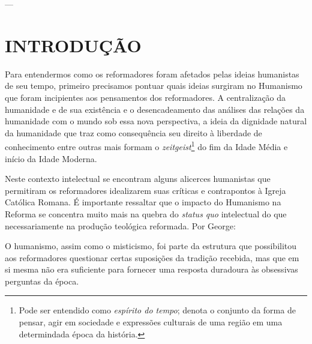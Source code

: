 \documentclass[
    article,            %
	12pt,				%
	oneside,			%
	a4paper,			%
	chapter=TITLE,		%
	section=TITLE,		%
	english,			%
	french,				%
	spanish,			%
	brazil				%
	]{abntex2}
\begin{document}



\imprimircapa

\imprimirfolhaderosto

---
\tableofcontents*
\cleardoublepage

\textual



\section{INTRODUÇÃO}
Para entendermos como os reformadores foram afetados pelas ideias humanistas de seu tempo, primeiro precisamos pontuar quais ideias surgiram no Humanismo que foram incipientes aos pensamentos dos reformadores. A centralização da humanidade e de sua existência e o desencadeamento das análises das relações da humanidade com o mundo sob essa nova perspectiva, a ideia da dignidade natural da humanidade que traz como consequência seu direito à liberdade de conhecimento entre outras mais formam o \emph{zeitgeist}\footnote{Pode ser entendido como \emph{espírito do tempo}; denota o conjunto da forma de pensar, agir em sociedade e expressões culturais de uma região em uma determindada época da história.} do fim da Idade Média e início da Idade Moderna.

Neste contexto intelectual se encontram alguns alicerces humanistas que permitiram os reformadores idealizarem suas críticas e contrapontos à Igreja Católica Romana. É importante ressaltar que o impacto do Humanismo na Reforma se concentra muito mais na quebra do \emph{status quo} intelectual do que necessariamente na produção teológica reformada. Por George:
\begin{citacao}
O humanismo, assim como o misticismo, foi parte da estrutura que possibilitou aos reformadores questionar certas suposições da tradição recebida, mas que em si mesma não era suficiente para fornecer uma resposta duradoura às obsessivas perguntas da época. \cite[p.49]{GEORGE}
\end{citacao}
\end{document}
